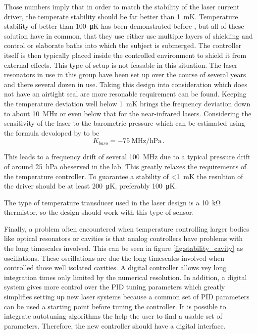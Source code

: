 Those numbers imply that in order to match the stability of the laser current driver, the temperate stability should be far better than \qty{1}{\milli \K}. Temperature stability of better than \qty{100}{\micro \K} has been demonstrated before \cite{tempcontroller_10uK,tempcontroller_10uK_jw,tempcontroller_15uK,tempcontroller_30uK,tempcontroller_40uK,tempcontroller_50uK,tempcontroller_65uK}, but all of these solution have in common, that they use either use multiple layers of shielding and control or elaborate baths into which the subject is submerged. The controller itself is then typically placed inside the controlled environment to shield it from external effects. This type of setup is not feasable in this situation. The laser resonators in use in this group \cite{thesis_tilman} have been set up over the course of several years and there several dozen in use. Taking this design into consideration which does not have an airtight seal are more resonable requirement can be found. Keeping the temperature deviation well below \qty{1}{\milli \K} brings the frequency deviation down to about \qty{10}{\MHz} or even below that for the near-infrared lasers. Considering the sensitivity of the laser to the barometric pressure which can be estimated using the formula devoloped by \citeauthor{ciddor} \cite{ciddor} to be
\begin{equation}
    K_{baro} =  \qty{-75}{\MHz \per \hecto \Pa}\,.
\end{equation}

This leads to a frequency drift of several \qty{100}{\MHz} due to a typical pressure drift of around \qty{25}{\hecto \Pa} obeserved in the lab. This greatly relaxes the requirements of the temperature controller. To guarantee a stability of \qty{<1}{\milli \K} the resultion of the driver should be at least \qty{200}{\micro \K}, preferably \qty{100}{\micro \K}.

The type of temperature transducer used in the laser design is a \qty{10}{\kilo \ohm} thermistor, so the design should work with this type of sensor.

Finally, a problem often encountered when temperature controlling larger bodies like optical resonators or cavities is that analog controllers have problems with the long timescales involved. This can be seen in figure \ref{fig:stability_cavity} as oscillations. These oscillations are due the long timescales involved when controlled those well isolated cavities. A digital controller allows vey long integration times only limited by the numerical resolution. In addition, a digital system gives more control over the PID tuning parameters which greatly simplifies setting up new laser systems because a common set of PID parameters can be used a starting point before tuning the controller. It is possible to integrate autotuning algorithms the help the user to find a usable set of parameters. Therefore, the new controller should have a digital interface.

